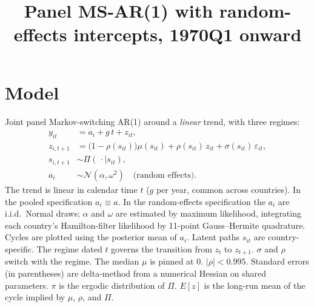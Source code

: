 \documentclass[11pt]{article}
\title{Panel MS-AR(1) with random-effects intercepts, 1970Q1 onward}
\author{}
\date{}
\begin{document}
\maketitle
\section{Model}
Joint panel Markov-switching AR(1) around a \emph{linear} trend, with three regimes:
\begin{align}
y_{it} &= a_i + g\, t + z_{it}, \\
z_{i,t+1} &= \bigl(1-\rho(s_{it})\bigr)\mu(s_{it}) + \rho(s_{it})\, z_{it} + \sigma(s_{it})\,\varepsilon_{it}, \\
s_{i,t+1} &\sim \Pi(\,\cdot\mid s_{it}), \\
a_i &\sim \mathcal{N}(\alpha,\omega^2) \quad \text{(random effects)}.
\end{align}
The trend is linear in calendar time $t$ ($g$ per year, common across countries). In the pooled specification $a_i\equiv a$. In the random-effects specification the $a_i$ are i.i.d.\ Normal draws; $\alpha$ and $\omega$ are estimated by maximum likelihood, integrating each country's Hamilton-filter likelihood by 11-point Gauss--Hermite quadrature. Cycles are plotted using the posterior mean of $a_i$. Latent paths $s_{it}$ are country-specific. The regime dated $t$ governs the transition from $z_t$ to $z_{t+1}$. $\sigma$ and $\rho$ switch with the regime. The median $\mu$ is pinned at 0. $|\rho|<0.995$.
Standard errors (in parentheses) are delta-method from a numerical Hessian on shared parameters. $\pi$ is the ergodic distribution of $\Pi$. $E[z]$ is the long-run mean of the cycle implied by $\mu$, $\rho$, and $\Pi$.
\clearpage
\end{document}

